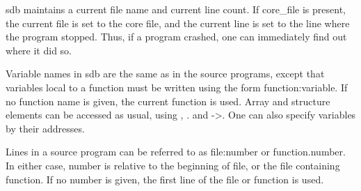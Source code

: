 {\cmd sdb } maintains a current file name and current
line count. If  {\ms core\_file} is  present, the current file is set to
the core file, and the current line is set to the line  where the
program stopped.  Thus, if  a program crashed, one can immediately
find out where it did so.

     Variable names in {\cmd sdb} are the same as in the source
programs, except that variables  local   to  a   function   must  be
written   using   the   form {\ms function\/}:{\ms variable\/}. If no
function  name is given, the current function is used. Array and
structure elements can be accessed as usual, using {\cd []}, . and
{\cd ->}.  One can also specify variables by their addresses.

     Lines in  a  source  program can  be referred  to as  {\ms
file\/}:{\ms number\/} or {\ms function\/}.{\ms number\/}. In  either
case, {\ms number\/} is relative to the beginning of  {\ms
file\/},  or the  file containing  {\ms function\/}. If no {\ms
number\/} is given, the first line of the {\ms file\/} or {\ms
function\/} is used.

